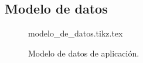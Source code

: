 %
%

\subsection{Modelo de datos}

\begin{figure}
  \begin{center}
    {modelo_de_datos.tikz.tex}
    \caption{Modelo de datos de aplicación.}
    \label{figura:modelo_De_datos}
  \end{center}
\end{figure}
